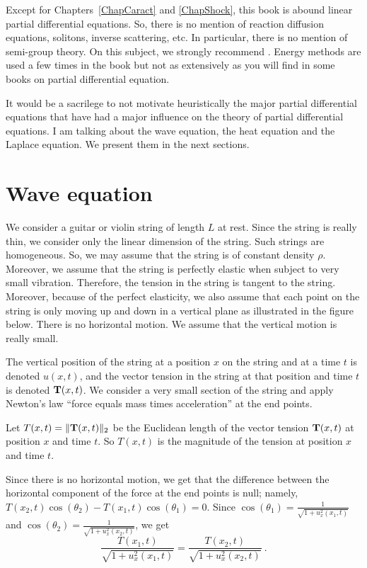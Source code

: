 Except for Chapters~\ref{ChapCaract} and \ref{ChapShock}, this book
is abound linear partial differential equations.  So, there is no
mention of reaction diffusion equations, solitons, inverse scattering,
etc.  In particular, there is no mention of semi-group theory.  On
this subject, we strongly recommend \cite{He}.  Energy methods are
used a few times in the book but not as extensively as you will find
in some books on partial differential equation.

It would be a sacrilege to not motivate heuristically the major partial
differential equations that have had a major influence on the theory
of partial differential equations.  I am talking about the wave
equation, the heat equation and the Laplace equation.  We present them
in the next sections.

\section*{Wave equation}

We consider a guitar or violin string of length $L$ at rest.  Since
the string is really thin, we consider only the linear dimension of
the string.  Such strings are homogeneous.  So, we may assume that the
string is of constant density $\rho$.
Moreover, we assume that the string is perfectly elastic when
subject to very small vibration.  Therefore, the tension in the string
is tangent to the string.   Moreover, because of the perfect
elasticity, we also assume that each point on the string is only moving
up and down in a vertical plane as illustrated in the figure below.
There is no horizontal motion.  We assume that the vertical motion is
really small.


The vertical position of the string at a position $x$ on the string
and at a time $t$ is denoted $u(x,t)$, and the vector tension in the string
at that position and time $t$ is denoted $\mathbf{T}(x,t)$.  We consider a
very small section of the string and apply Newton's law
``force equals mass times acceleration'' at the end points.   

Let $T(x,t) = \|\mathbf{T}(x,t)\|_2$ be the Euclidean length of the
vector tension $\mathbf{T}(x,t)$ at position $x$ and time $t$.  So
$T(x,t)$ is the magnitude of the tension at position $x$ and time $t$.


Since there is no horizontal motion, we get that the difference between
the horizontal component of the force at the end points is null; namely,
$T(x_2,t) \cos(\theta_2) - T(x_1,t) \cos(\theta_1) = 0$.  Since
$\displaystyle \cos(\theta_1) = \frac{1}{\sqrt{1+u_x^2(x_1,t)}}$ and
$\displaystyle \cos(\theta_2) = \frac{1}{\sqrt{1+u_x^2(x_2,t)}}$, we
get
\begin{equation} \label{prefaceEq1}
\frac{T(x_1,t)}{\sqrt{1+u_x^2(x_1,t)}}
= \frac{T(x_2,t)}{\sqrt{1+u_x^2(x_2,t)}} \ .  \tag{$1$}
\end{equation}

